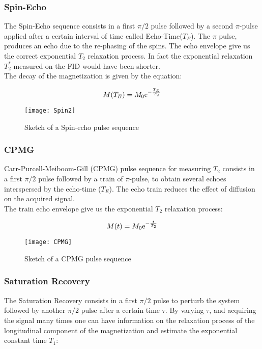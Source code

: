 \documentclass[a4paper,11pt]{report}
\begin{document}
	\subsubsection{Spin-Echo} \label{spinecho}
	 The Spin-Echo sequence consists in a first $\pi/2$ pulse followed by a second $\pi$-pulse applied after a certain interval of time called Echo-Time($T_E$). The $\pi$ pulse, produces an echo due to the re-phasing of the spins. The echo envelope give us the correct exponential $T_2$ relaxation process. In fact the exponential relaxation $T_{2}^*$ measured on the FID would have been shorter.\\ The decay of the magnetization is given by the equation:
         
         \begin{equation}
         	\large{M(T_E)=M_0\mathrm{e}^{- \frac{T_E}{T_2}}}
         \end{equation}
         \begin{figure}[h]
      	\centering
      	\texttt{[image: Spin2]}
      	\caption{Sketch of a Spin-echo pulse sequence}\label{Spinecho}
      \end{figure}
      \subsubsection{CPMG} 
      Carr-Purcell-Meiboom-Gill (CPMG) pulse sequence for measuring $T_2$ consists in a first $\pi/2$ pulse followed by a train of $\pi$-pulse, to obtain several echoes interspersed by the echo-time ($T_E$). The echo train reduces the effect of diffusion on the acquired signal. \\The train echo envelope give us the exponential $T_2$ relaxation process: 
       
      \begin{equation}
      	\large{M(t)= M_0 \mathrm{e}^{- \frac{t}{T_2}}}
      \end{equation}
      
      \begin{figure}[h]
      	\centering
      	\texttt{[image: CPMG]}
      	\caption{Sketch of a CPMG pulse sequence}\label{CPMG}
      \end{figure}
      
      
      
      
      \subsubsection{Saturation Recovery}
      The Saturation Recovery consists in a first $\pi/2$ pulse to perturb the system followed by another $\pi/2$ pulse after a certain time $\tau$.  By varying $\tau$, and acquiring the signal many times one can have information on the relaxation process  of the longitudinal component of the magnetization and estimate the exponential constant time $T_1$:   
\end{document}
